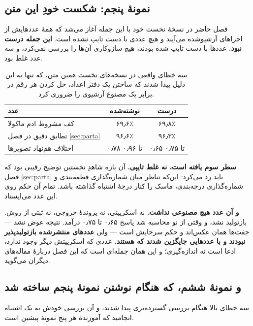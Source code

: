 \subsection{نمونهٔ پنجم: شکست خودِ این متن}
\label{sec:our-own-failure}

فصل حاضر در نسخهٔ نخست خود با این جمله آغاز می‌شد که همهٔ عددهایش از اجراهای آرشیوشده می‌آیند و
هیچ عددی با دست تایپ نشده است. \textbf{این جمله درست نبود.} عددها با دست تایپ شده بودند، هیچ
سازوکاری آن‌ها را بررسی نمی‌کرد، و سه عدد غلط بود.

\begin{table}[H]
\caption{سه خطای واقعی در نسخه‌های نخست همین متن، که تنها به این دلیل پیدا شدند که ساختن یک
دفتر اعداد، حل کردن هر رقم در برابر یک مصنوع آرشیوی را ضروری کرد.}
\centering
\begin{tabular}{|l|c|c|}
\hline
\textbf{عدد} & \textbf{نوشته‌شده} & \textbf{درست} \\ \hline
کف مشروط ادم ماکولا & \num{۶۹٫۶}٪ & \num{۶۹٫۸}٪ \\ \hline
تطابق دقیق در فصل \ref{sec:parta} & \num{۹۶٫۶}٪ & \num{۹۶٫۳}٪ \\ \hline
اختلاف هم‌نهاد تصویرها & \num{۰٫۷۸} تا \num{۰٫۹۶} & \num{۰٫۶۵} تا \num{۰٫۷۵} \\ \hline
\end{tabular}
\label{tab:our-failure}
\end{table}

\textbf{سطر سوم یافته است، نه غلط تایپی.} آن بازه شاهدِ نخستین توضیح رقیبی بود که فصل
\ref{sec:parta} باید رد می‌کرد: این‌که تناظر میان شماره‌گذاری قطعه‌بندی و شماره‌گذاری
درجه‌بندی، ماسک را کنار درجهٔ اشتباه گذاشته باشد. تمام آن حکم روی این عدد می‌ایستاد.

\textbf{و آن عدد هیچ مصنوعی نداشت.} نه اسکریپتی، نه پروندهٔ خروجی، نه ثبتی از روش. بازتولید
نشد، و وقتی از نو محاسبه شد پاسخ \num{۰٫۶۵} تا \num{۰٫۷۵} درآمد. نتیجه عوض نشد — جفت‌ها همان
عکس‌اند و حکم سرجایش است — ولی \textbf{عددهای منتشرشده بازتولیدپذیر نبودند و با عددهایی
جایگزین شدند که هستند.} عددی که اسکریپتش دیگر وجود ندارد، ادعا است نه اندازه‌گیری؛ و این همان
جمله‌ای است که این فصل دربارهٔ مقاله‌های دیگران می‌گوید.

\subsection{و نمونهٔ ششم، که هنگام نوشتن نمونهٔ پنجم ساخته شد}

سه خطای بالا هنگام بررسی گسترده‌تری پیدا شدند، و آن بررسی خودش به یک اشتباه انجامید که آموزندهٔ
هر پنج نمونهٔ پیشین است.

